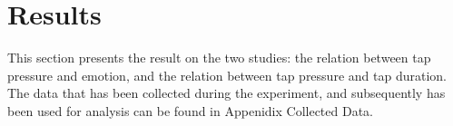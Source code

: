\documentclass{sigchi}
\begin{document}








\section{Results} %
\label{sec:results}{}
This section presents the result on the two studies: the relation between tap pressure and emotion, and the relation between tap pressure and tap duration. The data that has been collected during the experiment, and subsequently has been used for analysis can be found in Appenidix Collected Data.
\end{document}
